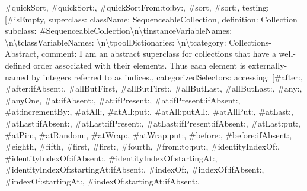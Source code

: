 {\textquotedbl{}\#quickSort\textquotedbl{}, \textquotedbl{}\#quickSort:\textquotedbl{}, \textquotedbl{}\#quickSortFrom:to:by:\textquotedbl{}, \textquotedbl{}\#sort\textquotedbl{}, \textquotedbl{}\#sort:\textquotedbl{}{]}, \textquotedbl{}testing\textquotedbl{}: {[}\textquotedbl{}\#isEmpty\textquotedbl{}{]}\textbraceright , \textquotedbl{}superclass\textquotedbl{}: \textbraceleft \textquotedbl{}className\textquotedbl{}: \textquotedbl{}SequenceableCollection\textquotedbl{}, \textquotedbl{}definition\textquotedbl{}: \textquotedbl{}Collection subclass: \#SequenceableCollection\allowbreak\textbackslash n\allowbreak\textbackslash tinstanceVariableNames: \textquotesingle{}\textquotesingle{}\allowbreak\textbackslash n\allowbreak\textbackslash tclassVariableNames: \textquotesingle{}\textquotesingle{}\allowbreak\textbackslash n\allowbreak\textbackslash tpoolDictionaries: \textquotesingle{}\textquotesingle{}\allowbreak\textbackslash n\allowbreak\textbackslash tcategory: \textquotesingle{}Collections-Abstract\textquotesingle{}\textquotedbl{}, \textquotedbl{}comment\textquotedbl{}: \textquotedbl{}I am an abstract superclass for collections that have a well-defined order associated with their elements. Thus each element is externally-named by integers referred to as indices.\textquotedbl{}, \textquotedbl{}categorizedSelectors\textquotedbl{}: \textbraceleft \textquotedbl{}accessing\textquotedbl{}: {[}\textquotedbl{}\#after:\textquotedbl{}, \textquotedbl{}\#after:ifAbsent:\textquotedbl{}, \textquotedbl{}\#allButFirst\textquotedbl{}, \textquotedbl{}\#allButFirst:\textquotedbl{}, \textquotedbl{}\#allButLast\textquotedbl{}, \textquotedbl{}\#allButLast:\textquotedbl{}, \textquotedbl{}\#any:\textquotedbl{}, \textquotedbl{}\#anyOne\textquotedbl{}, \textquotedbl{}\#at:ifAbsent:\textquotedbl{}, \textquotedbl{}\#at:ifPresent:\textquotedbl{}, \textquotedbl{}\#at:ifPresent:ifAbsent:\textquotedbl{}, \textquotedbl{}\#at:incrementBy:\textquotedbl{}, \textquotedbl{}\#atAll:\textquotedbl{}, \textquotedbl{}\#atAll:put:\textquotedbl{}, \textquotedbl{}\#atAll:putAll:\textquotedbl{}, \textquotedbl{}\#atAllPut:\textquotedbl{}, \textquotedbl{}\#atLast:\textquotedbl{}, \textquotedbl{}\#atLast:ifAbsent:\textquotedbl{}, \textquotedbl{}\#atLast:ifPresent:\textquotedbl{}, \textquotedbl{}\#atLast:ifPresent:ifAbsent:\textquotedbl{}, \textquotedbl{}\#atLast:put:\textquotedbl{}, \textquotedbl{}\#atPin:\textquotedbl{}, \textquotedbl{}\#atRandom:\textquotedbl{}, \textquotedbl{}\#atWrap:\textquotedbl{}, \textquotedbl{}\#atWrap:put:\textquotedbl{}, \textquotedbl{}\#before:\textquotedbl{}, \textquotedbl{}\#before:ifAbsent:\textquotedbl{}, \textquotedbl{}\#eighth\textquotedbl{}, \textquotedbl{}\#fifth\textquotedbl{}, \textquotedbl{}\#first\textquotedbl{}, \textquotedbl{}\#first:\textquotedbl{}, \textquotedbl{}\#fourth\textquotedbl{}, \textquotedbl{}\#from:to:put:\textquotedbl{}, \textquotedbl{}\#identityIndexOf:\textquotedbl{}, \textquotedbl{}\#identityIndexOf:ifAbsent:\textquotedbl{}, \textquotedbl{}\#identityIndexOf:startingAt:\textquotedbl{}, \textquotedbl{}\#identityIndexOf:startingAt:ifAbsent:\textquotedbl{}, \textquotedbl{}\#indexOf:\textquotedbl{}, \textquotedbl{}\#indexOf:ifAbsent:\textquotedbl{}, \textquotedbl{}\#indexOf:startingAt:\textquotedbl{}, \textquotedbl{}\#indexOf:startingAt:ifAbsent:\textquotedbl{}, }
